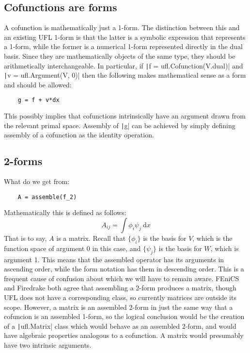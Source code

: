 \documentclass[a4paper,11pt]{article}
\begin{document}
\subsection{Cofunctions are forms}

A cofunction is mathematically just a 1-form. The distinction between this and an existing UFL 1-form is that the latter is a symbolic expression that represents a 1-form, while the former is a numerical 1-form represented directly in the dual basis. Since they are mathematically objects of the same type, they should be arithmetically interchangeable. In particular, if \texttt|f = ufl.Cofunction(V.dual)|  and \texttt|v = ufl.Argument(V, 0)| then the following makes mathematical sense as a form and should be allowed:
\begin{verbatim}
    g = f + v*dx
\end{verbatim}
This possibly implies that cofunctions intrinsically have an argument drawn from the relevant primal space. Assembly of \texttt|g| can be achieved by simply defining assembly of a cofunction as the identity operation.

\subsection{2-forms}

What do we get from:
\begin{verbatim}
    A = assemble(f_2)
\end{verbatim}
Mathematically this is defined as follows:
\begin{equation}
    A_{ij} = \int \phi_i \psi_j\ \mathrm{d}x
\end{equation}
That is to say, $A$ is a matrix. Recall that $\{\phi_i\}$ is the basis for $V$, which is the function space of argument 0 in this case, and $\{\psi_j\}$ is the basis for $W$, which is argument 1. This means that the assembled operator has its arguments in ascending order, while the form notation has them in descending order. This is a frequent cause of confusion about which we will have to remain aware. FEniCS and Firedrake both agree that assembling a 2-form produces a matrix, though UFL does not have a corresponding class, so currently matrices are outside its scope. However, a matrix is an assembled 2-form in just the same way that a cofuncion is an assembled 1-form, so the logical conclusion would be the creation of a \texttt|ufl.Matrix| class which would behave as an assembled 2-form, and would have algebraic properties analogous to a cofunction. A matrix would presumably have two intrinsic arguments.
\end{document}
